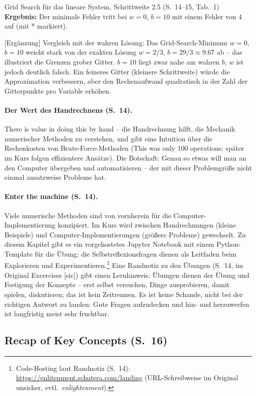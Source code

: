 \begin{bspbox}{Grid Search für das lineare System, Schrittweite 2.5 (S.~14--15, Tab.~1)}
\textbf{Ergebnis:} Der minimale Fehler tritt bei $w = 0$, $b = 10$ mit einem Fehler von $4$ auf (mit * markiert).

[Ergänzung] Vergleich mit der wahren Lösung: Das Grid-Search-Minimum $w = 0$, $b = 10$ weicht stark von der exakten Lösung $w = 2/3$, $b = 29/3 \approx 9.67$ ab -- das illustriert die Grenzen grober Gitter. $b = 10$ liegt zwar nahe am wahren $b$, $w$ ist jedoch deutlich falsch. Ein feineres Gitter (kleinere Schrittweite) würde die Approximation verbessern, aber den Rechenaufwand quadratisch in der Zahl der Gitterpunkte pro Variable erhöhen.
\end{bspbox}

\paragraph{Der Wert des Handrechnens (S.~14).} \glqq There is value in doing this by hand\grqq{} -- die Handrechnung hilft, die Mechanik numerischer Methoden zu verstehen, und gibt eine Intuition über die Rechenkosten von Brute-Force-Methoden (\glqq This was only 100 operations\grqq; später im Kurs folgen effizientere Ansätze). Die Botschaft: Genau so etwas will man an den Computer übergeben und automatisieren -- der mit dieser Problemgröße nicht einmal ansatzweise Probleme hat.

\paragraph{Enter the machine (S.~14).} Viele numerische Methoden sind von vornherein für die Computer-Implementierung konzipiert. Im Kurs wird zwischen Handrechnungen (kleine Beispiele) und Computer-Implementierungen (größere Probleme) gewechselt. Zu diesem Kapitel gibt es ein vorgehostetes Jupyter Notebook mit einem Python-Template für die Übung; die Selbstreflexionsfragen dienen als Leitfaden beim Explorieren und Experimentieren.\footnote{Code-Hosting laut Randnotiz (S.~14): \url{https://enlitenment.schutera.com/landing} (URL-Schreibweise im Original unsicher, evtl.\ \emph{enlightenment}).} Eine Randnotiz zu den Übungen (S.~14, im Original \glqq Excercises\grqq{} [sic]) gibt einen Lernhinweis: Übungen dienen der Übung und Festigung der Konzepte -- erst selbst versuchen, Dinge ausprobieren, damit spielen, diskutieren; das ist kein Zeitrennen. Es ist keine Schande, nicht bei der richtigen Antwort zu landen: Gute Fragen aufzudecken und hin- und herzuwerfen ist langfristig meist sehr fruchtbar.

\subsection{Recap of Key Concepts (S.~16)}


